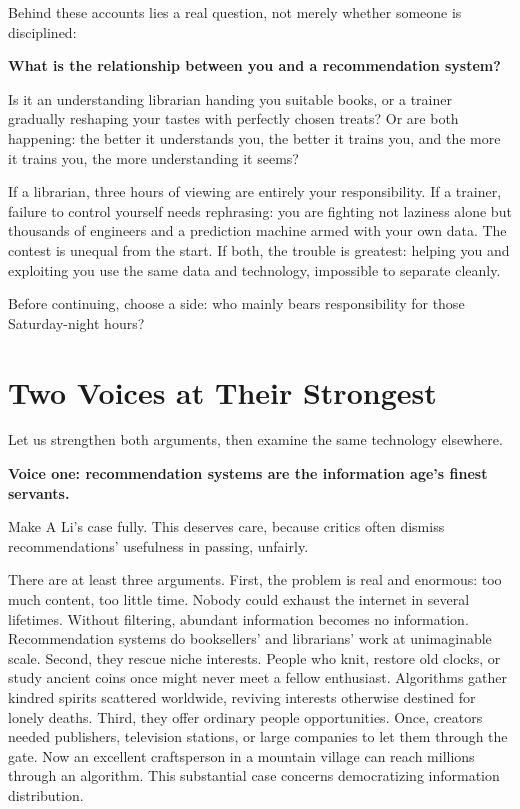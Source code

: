 Behind these accounts lies a real question, not merely whether someone is disciplined:

\textbf{What is the relationship between you and a recommendation system?}

Is it an understanding librarian handing you suitable books, or a trainer gradually reshaping your tastes with perfectly chosen treats? Or are both happening: the better it understands you, the better it trains you, and the more it trains you, the more understanding it seems?

If a librarian, three hours of viewing are entirely your responsibility. If a trainer, failure to control yourself needs rephrasing: you are fighting not laziness alone but thousands of engineers and a prediction machine armed with your own data. The contest is unequal from the start. If both, the trouble is greatest: helping you and exploiting you use the same data and technology, impossible to separate cleanly.

Before continuing, choose a side: who mainly bears responsibility for those Saturday-night hours?

\section{Two Voices at Their Strongest}
Let us strengthen both arguments, then examine the same technology elsewhere.

\textbf{Voice one: recommendation systems are the information age's finest servants.}

Make A Li's case fully. This deserves care, because critics often dismiss recommendations' usefulness in passing, unfairly.

There are at least three arguments. First, the problem is real and enormous: too much content, too little time. Nobody could exhaust the internet in several lifetimes. Without filtering, abundant information becomes no information. Recommendation systems do booksellers' and librarians' work at unimaginable scale. Second, they rescue niche interests. People who knit, restore old clocks, or study ancient coins once might never meet a fellow enthusiast. Algorithms gather kindred spirits scattered worldwide, reviving interests otherwise destined for lonely deaths. Third, they offer ordinary people opportunities. Once, creators needed publishers, television stations, or large companies to let them through the gate. Now an excellent craftsperson in a mountain village can reach millions through an algorithm. This substantial case concerns democratizing information distribution.

